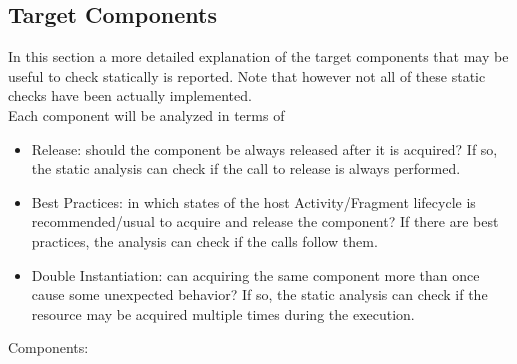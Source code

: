 \documentclass[11pt,a4paper,notitlepage]{article}
\begin{document}
\subsection{Target Components}
In this section a more detailed explanation of the target components that may be useful to check statically is reported. Note that however not all of these static checks have been actually implemented.\bigskip \\
Each component will be analyzed in terms of
\begin{itemize}
	\item Release: should the component be always released after it is acquired? If so, the static analysis can check if the call to release is always performed.
	\item Best Practices: in which states of the host Activity/Fragment lifecycle is recommended/usual to acquire and release the component? If there are best practices, the analysis can check if the calls follow them.
	\item Double Instantiation: can acquiring the same component more than once cause some unexpected behavior? If so, the static analysis can check if the resource may be acquired multiple times during the execution.
\end{itemize}
Components:
\end{document}
